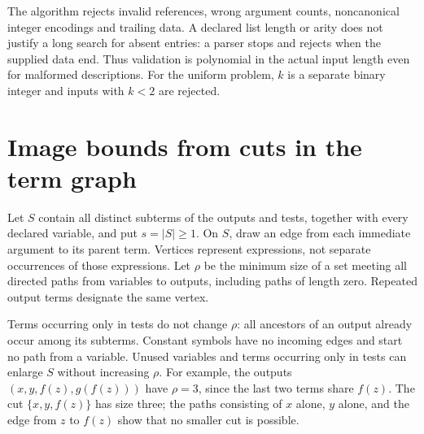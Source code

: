 \documentclass[12pt]{article}
\theoremstyle{definition}
\begin{document}
The algorithm rejects invalid references, wrong argument counts,
noncanonical integer encodings and trailing data. A declared list length
or arity does not justify a long search for absent entries: a parser
stops and rejects when the supplied data end. Thus validation is
polynomial in the actual input length even for malformed descriptions.
For the uniform problem, $k$ is a separate binary integer and inputs
with $k<2$ are rejected.

\section{Image bounds from cuts in the term graph}\label{sec:routing}
Let $S$ contain all distinct subterms of the outputs and tests, together
with every declared variable, and put $s=|S|\ge1$. On $S$, draw an edge
from each immediate argument to its parent term. Vertices represent
expressions, not separate occurrences of those expressions. Let $\rho$
be the minimum size of a set meeting all directed paths from variables
to outputs, including paths of length zero. Repeated output terms
designate the same vertex.

Terms occurring only in tests do not change $\rho$: all ancestors of
an output already occur among its subterms. Constant symbols have no
incoming edges and start no path from a variable. Unused variables and
terms occurring only in tests can enlarge $S$ without increasing $\rho$.
For example, the outputs $(x,y,f(z),g(f(z)))$ have $\rho=3$, since the
last two terms share $f(z)$. The cut $\{x,y,f(z)\}$ has size three;
the paths consisting of $x$ alone, $y$ alone, and the edge from $z$ to
$f(z)$ show that no smaller cut is possible.
\end{document}
